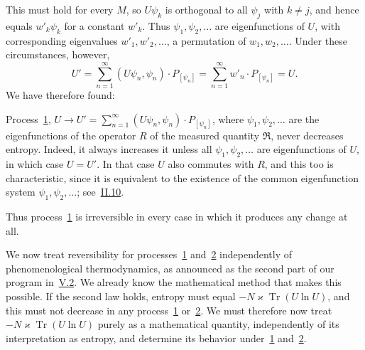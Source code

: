\documentclass[fontsize=13pt,twoside,openany,headings=normal,parskip=false,bookmarkpackage=false,DIV=calc]{scrbook}
\begin{document}
\hypertarget{origpage-206}{}%
This must hold for every $M$, so $U\psi_k$ is orthogonal to all $\psi_j$ with $k\ne j$, and hence equals $w'_k\psi_k$ for a constant $w'_k$. Thus $\psi_1,\psi_2,\ldots$ are eigenfunctions of $U$, with corresponding eigenvalues $w'_1,w'_2,\ldots$, a permutation of $w_1,w_2,\ldots$. Under these circumstances, however,
\[
U'=\sum_{n=1}^{\infty}(U\psi_n,\psi_n)\cdot P_{[\psi_n]}
=\sum_{n=1}^{\infty}w'_n\cdot P_{[\psi_n]}=U.
\]
We have therefore found:

Process~\hyperref[eq:V.1.1]{1}, $U\to U'=\sum_{n=1}^{\infty}(U\psi_n,\psi_n)\cdot P_{[\psi_n]}$, where $\psi_1,\psi_2,\ldots$ are the eigenfunctions of the operator $R$ of the measured quantity $\mathfrak R$, never decreases entropy. Indeed, it always increases it unless all $\psi_1,\psi_2,\ldots$ are eigenfunctions of $U$, in which case $U=U'$. In that case $U$ also commutes with $R$, and this too is characteristic, since it is equivalent to the existence of the common eigenfunction system $\psi_1,\psi_2,\ldots$; see~\hyperref[sec:II.10]{II.10}.

Thus process~\hyperref[eq:V.1.1]{1} is irreversible in every case in which it produces any change at all.

We now treat reversibility for processes~\hyperref[eq:V.1.1]{1} and~\hyperref[eq:V.1.2]{2} independently of phenomenological thermodynamics, as announced as the second part of our program in~\hyperref[sec:V.2]{V.2}. We already know the mathematical method that makes this possible. If the second law holds, entropy must equal $-N\varkappa\operatorname{Tr}(U\ln U)$, and this must not decrease in any process~\hyperref[eq:V.1.1]{1} or~\hyperref[eq:V.1.2]{2}. We must therefore now treat $-N\varkappa\operatorname{Tr}(U\ln U)$ purely as a mathematical quantity, independently of its interpretation as entropy, and determine its behavior under~\hyperref[eq:V.1.1]{1} and~\hyperref[eq:V.1.2]{2}.
\end{document}
